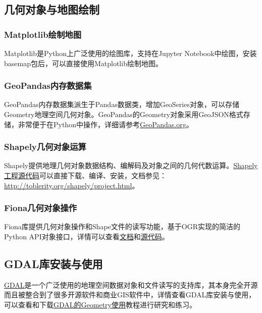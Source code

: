 \documentclass[letterpaper,10pt,english]{sphinxmanual}
\begin{document}
\subsection{几何对象与地图绘制}
\label{gispark_process:_u51e0_u4f55_u5bf9_u8c61_u4e0e_u5730_u56fe_u7ed8_u5236}

\subsubsection{Matplotlib绘制地图}
\label{gispark_process:Matplotlib_u7ed8_u5236_u5730_u56fe}
Matplotlib是Python上广泛使用的绘图库，支持在Jupyter
Notebook中绘图，安装basemap包后，可以直接使用Matplotlib绘制地图。


\subsubsection{GeoPandas内存数据集}
\label{gispark_process:GeoPandas_u5185_u5b58_u6570_u636e_u96c6}
GeoPandas内存数据集派生于Pandas数据类，增加GeoSeries对象，可以存储Geometry地理空间几何对象。GeoPandas的Geometry对象采用GeoJSON格式存储，非常便于在Python中操作，详细请参考\href{http://www.GeoPandas.org}{GeoPandas.org}。


\subsubsection{Shapely几何对象运算}
\label{gispark_process:Shapely_u51e0_u4f55_u5bf9_u8c61_u8fd0_u7b97}
Shapely提供地理几何对象数据结构、编解码及对象之间的几何代数运算。\href{https://github.com/Toblerity/Shapely.git}{Shapely工程源代码}可以直接下载、编译、安装，文档参见：\url{http://toblerity.org/shapely/project.html}。


\subsubsection{Fiona几何对象操作}
\label{gispark_process:Fiona_u51e0_u4f55_u5bf9_u8c61_u64cd_u4f5c}
Fiona库提供几何对象操作和Shape文件的读写功能，基于OGR实现的简洁的Python
API对象接口，详情可以查看\href{http://toblerity.org/fiona/README.html\#usage}{文档}和\href{https://github.com/Toblerity/Fiona}{源代码}。


\subsection{GDAL库安装与使用}
\label{gispark_process:GDAL_u5e93_u5b89_u88c5_u4e0e_u4f7f_u7528}
\href{http://www.gdal.org}{GDAL}是一个广泛使用的地理空间数据对象和文件读写的支持库，其本身完全开源而且被整合到了很多开源软件和商业GIS软件中，详情查看GDAL库安装与使用，可以查看和下载\href{http://nbviewer.jupyter.org/github/supergis/git\_notebook/blob/master/gdal/gdal-geometry.ipynb}{GDAL的Geometry使用}教程进行研究和练习。
\end{document}
